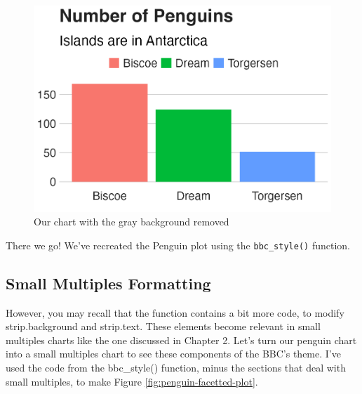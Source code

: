 \documentclass[
]{book}
\begin{document}
\begin{figure}
\includegraphics[width=1\linewidth]{custom-theme_files/figure-latex/penguins-plot-no-bg-1} \caption{Our chart with the gray background removed}\label{fig:penguins-plot-no-bg}
\end{figure}

There we go! We've recreated the Penguin plot using the \texttt{bbc\_style()} function.

\hypertarget{small-multiples-formatting}{%
\subsection*{Small Multiples Formatting}\label{small-multiples-formatting}}

However, you may recall that the function contains a bit more code, to modify strip.background and strip.text. These elements become relevant in small multiples charts like the one discussed in Chapter 2. Let's turn our penguin chart into a small multiples chart to see these components of the BBC's theme. I've used the code from the bbc\_style() function, minus the sections that deal with small multiples, to make Figure \ref{fig:penguin-facetted-plot}.
\end{document}
